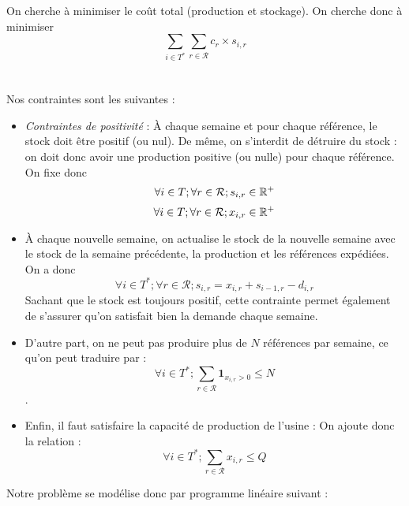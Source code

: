 \documentclass{rapport}
\begin{document}
On cherche à minimiser le coût total (production et stockage). On cherche donc à minimiser $$\sum_{i \in T^*} \sum_{r \in \mathcal{R}} c_r \times s_{i, r}$$ \\
\ \\
Nos contraintes sont les suivantes : \\
\begin{itemize}
\item \emph{Contraintes de positivité} : À chaque semaine et pour chaque référence, le stock doit être positif (ou nul).  De même, on s'interdit de détruire du stock : on doit donc avoir une production positive (ou nulle) pour chaque référence. On fixe donc $$\forall i \in T; \forall r \in \mathcal{R}; s_{i, r} \in \mathbb{R}^+$$ $$\forall i \in T; \forall r \in \mathcal{R}; x_{i, r} \in \mathbb{R}^+$$

\item À chaque nouvelle semaine, on actualise le stock de la nouvelle semaine avec le stock de la semaine précédente, la production et les références expédiées. On a donc $$\forall i \in T^*; \forall r \in \mathcal{R}; s_{i,r} = x_{i,r} + s_{i-1,r} - d_{i, r}$$
Sachant que le stock est toujours positif, cette contrainte permet également de s'assurer qu'on satisfait bien la demande chaque semaine.
\item D'autre part, on ne peut pas produire plus de $N$ références par semaine, ce qu'on peut traduire par : $$\forall i \in T^*; \sum_{r \in \mathcal{R}} \mathbf{1}_{x_{i, r} > 0} \le N$$.
\item Enfin, il faut satisfaire la capacité de production de l'usine : On ajoute donc la relation :
$$\forall i \in T^*; \sum_{r \in \mathcal{R}} x_{i, r} \le Q$$
\end{itemize}

Notre problème se modélise donc par programme linéaire suivant : \\
\ \\
\end{document}
